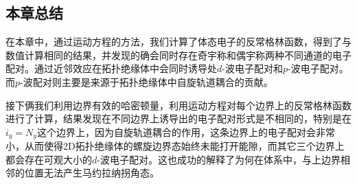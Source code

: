 \subsection{本章总结}
在本章中，通过运动方程的方法，我们计算了体态电子的反常格林函数，得到了与数值计算相同的结果，并发现的确会同时存在奇宇称和偶宇称两种不同通道的电子配对。通过近邻效应在拓扑绝缘体中会同时诱导处$d$-波电子配对和$p$-波电子配对。而$p$-波配对则主要是来源于拓扑绝缘体中自旋轨道耦合的贡献。

接下俩我们利用边界有效的哈密顿量，利用运动方程对每个边界上的反常格林函数进行了计算，结果发现在不同边界上诱导出的电子配对形式是不相同的，特别是在$i_y=N_y$这个边界上，因为自旋轨道耦合的作用，这条边界上的电子配对会非常小，从而使得2D拓扑绝缘体的螺旋边界态始终未能打开能隙，而其它三个边界上都会存在可观大小的$d$-波电子配对。这也成功的解释了为何在体系中，与上边界相邻的位置无法产生马约拉纳拐角态。












